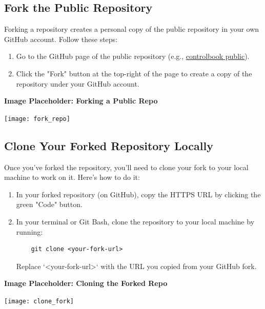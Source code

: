 \documentclass{article}
\begin{document}
\subsection{Fork the Public Repository}

Forking a repository creates a personal copy of the public repository in your own GitHub account. Follow these steps:

\begin{enumerate}
    \item Go to the GitHub page of the public repository (e.g., \href{https://github.com/randybeard/controlbook_public}{controlbook public}).
    \item Click the "Fork" button at the top-right of the page to create a copy of the repository under your GitHub account.
\end{enumerate}

\noindent \textbf{Image Placeholder: Forking a Public Repo}  
\begin{center}
    \texttt{[image: fork\_repo]} %
\end{center}

\subsection{Clone Your Forked Repository Locally}

Once you've forked the repository, you'll need to clone your fork to your local machine to work on it. Here's how to do it:

\begin{enumerate}
    \item In your forked repository (on GitHub), copy the HTTPS URL by clicking the green "Code" button.
    \item In your terminal or Git Bash, clone the repository to your local machine by running:
    \begin{verbatim}
    git clone <your-fork-url>
    \end{verbatim}
    Replace `<your-fork-url>` with the URL you copied from your GitHub fork.
\end{enumerate}

\noindent \textbf{Image Placeholder: Cloning the Forked Repo}  
\begin{center}
    \texttt{[image: clone\_fork]} %
\end{center}
\end{document}
